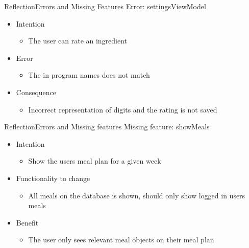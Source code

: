 \begin{frame}{Reflection}{Errors and Missing Features}%
	Error: settingsViewModel
	\begin{itemize}
		\item Intention
			\begin{itemize}
			\item The user can rate an ingredient
			\end{itemize}
		\item Error
			\begin{itemize}
			\item The in program names does not match
			\end{itemize}
		\item Consequence
			\begin{itemize}
			\item Incorrect representation of digits and the rating is not saved
			\end{itemize}
	\end{itemize}
\end{frame}
\begin{frame}{Reflection}{Errors and Missing features}	
		Missing feature: showMeals
		\begin{itemize}
			\item Intention
				\begin{itemize}
				\item Show the users meal plan for a given week
				\end{itemize}
			\item Functionality to change
				\begin{itemize}
				\item All meals on the database is shown, should only show logged in users meals
				\end{itemize}
			\item Benefit
				\begin{itemize}
				\item The user only sees relevant meal objects on their meal plan
				\end{itemize}
		\end{itemize}
\end{frame} %

